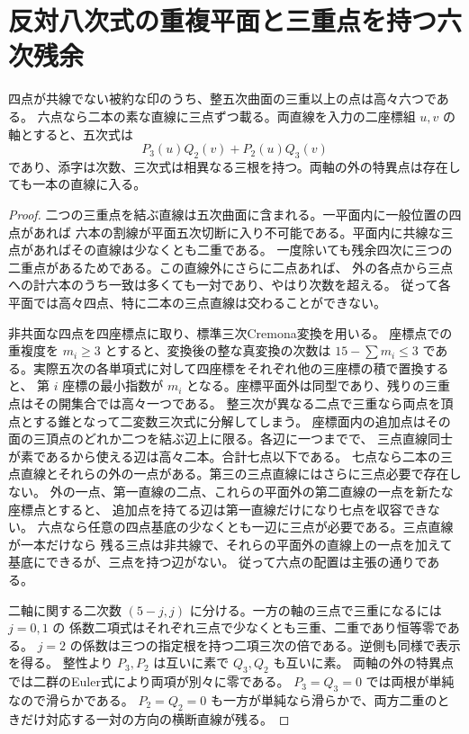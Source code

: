 \section{反対八次式の重複平面と三重点を持つ六次残余}
\label{sec:repeated-octic-plane-residual}
\begin{lemma}\label{lem:quintic-six-marked-triples}
四点が共線でない被約な印のうち、整五次曲面の三重以上の点は高々六つである。
六点なら二本の素な直線に三点ずつ載る。両直線を入力の二座標組 $u,v$ の軸とすると、五次式は
\[
                   P_3(u)Q_2(v)+P_2(u)Q_3(v)
\]
であり、添字は次数、三次式は相異なる三根を持つ。両軸の外の特異点は存在しても一本の直線に入る。
\end{lemma}
\begin{proof}
二つの三重点を結ぶ直線は五次曲面に含まれる。一平面内に一般位置の四点があれば
六本の割線が平面五次切断に入り不可能である。平面内に共線な三点があればその直線は少なくとも二重である。
一度除いても残余四次に三つの二重点があるためである。この直線外にさらに二点あれば、
外の各点から三点への計六本のうち一致は多くても一対であり、やはり次数を超える。
従って各平面では高々四点、特に二本の三点直線は交わることができない。

非共面な四点を四座標点に取り、標準三次Cremona変換を用いる。
座標点での重複度を $m_i\ge3$ とすると、変換後の整な真変換の次数は
$15-\sum m_i\le3$ である。実際五次の各単項式に対して四座標をそれぞれ他の三座標の積で置換すると、
第 $i$ 座標の最小指数が $m_i$ となる。座標平面外は同型であり、残りの三重点はその開集合では高々一つである。
整三次が異なる二点で三重なら両点を頂点とする錐となって二変数三次式に分解してしまう。
座標面内の追加点はその面の三頂点のどれか二つを結ぶ辺上に限る。各辺に一つまでで、
三点直線同士が素であるから使える辺は高々二本。合計七点以下である。
七点なら二本の三点直線とそれらの外の一点がある。第三の三点直線にはさらに三点必要で存在しない。
外の一点、第一直線の二点、これらの平面外の第二直線の一点を新たな座標点とすると、
追加点を持てる辺は第一直線だけになり七点を収容できない。
六点なら任意の四点基底の少なくとも一辺に三点が必要である。三点直線が一本だけなら
残る三点は非共線で、それらの平面外の直線上の一点を加えて基底にできるが、三点を持つ辺がない。
従って六点の配置は主張の通りである。

二軸に関する二次数 $(5-j,j)$ に分ける。一方の軸の三点で三重になるには $j=0,1$ の
係数二項式はそれぞれ三点で少なくとも三重、二重であり恒等零である。
$j=2$ の係数は三つの指定根を持つ二項三次の倍である。逆側も同様で表示を得る。
整性より $P_3,P_2$ は互いに素で $Q_3,Q_2$ も互いに素。
両軸の外の特異点では二群のEuler式により両項が別々に零である。
$P_3=Q_3=0$ では両根が単純なので滑らかである。
$P_2=Q_2=0$ も一方が単純なら滑らかで、両方二重のときだけ対応する一対の方向の横断直線が残る。
\end{proof}


